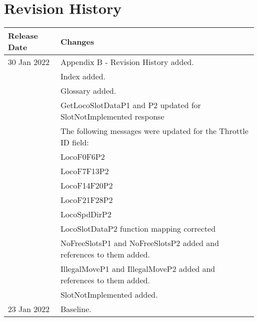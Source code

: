  

\chapter[Revision History]{Revision History}

\begin{tabular}{|p{3cm}|p{13cm}|}
\hline
\textbf{Release Date} & \textbf{Changes} \\
\hline
30 Jan 2022 & Appendix B - Revision History added.\\
& Index added.\\
& Glossary added.\\
& GetLocoSlotDataP1 and P2 updated for SlotNotImplemented response\\
& The following messages were updated for the Throttle ID field:\\
&   LocoF0F6P2\\
&   LocoF7F13P2\\
&   LocoF14F20P2\\
&   LocoF21F28P2\\
&   LocoSpdDirP2\\
& LocoSlotDataP2 function mapping corrected\\
& NoFreeSlotsP1 and NoFreeSlotsP2 added and references to them added.\\
& IllegalMoveP1 and IllegalMoveP2 added and references to them added.\\
& SlotNotImplemented added.\\
\hline
23 Jan 2022 & Baseline.\\
\hline
\end{tabular}

